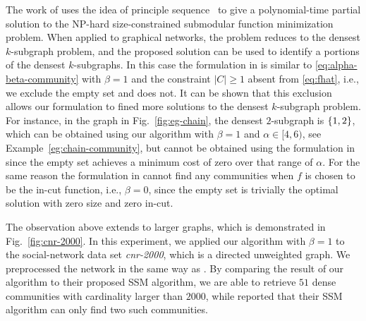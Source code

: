 The work of \cite{nagano2011size} uses the idea of principle
sequence~\cite{fujishige80,fujishige05,fujishige-pp-revisited} to give a polynomial-time partial
solution to the NP-hard size-constrained submodular function minimization problem. When applied to
graphical networks, the problem reduces to the densest $k$-subgraph problem, and the proposed
solution can be used to identify a portions of the densest $k$-subgraphs.
%
In this case the formulation  in \cite{nagano2011size} is similar to 
\eqref{eq:alpha-beta-community} 
with $\beta = 1$ and the constraint $|C| \geq 1$
absent from \eqref{eq:fhat}, i.e., we exclude the empty
set and \cite{nagano2011size} does not.
It can be shown that this exclusion allows our formulation to fined more solutions to the densest
$k$-subgraph problem. For instance, 
in the graph in Fig.~\ref{fig:eg-chain}, the densest $2$-subgraph is $\{1,2\}$, which can be
obtained using our algorithm with $\beta = 1$ and $\alpha \in [4,6)$, see
Example~\ref{eg:chain-community}, but cannot be obtained using the formulation in
\cite{nagano2011size} since the empty set achieves a minimum cost of zero over that range of
$\alpha$.
For the same reason the formulation in \cite{nagano2011size} cannot find any communities when
$f$ is chosen to be the in-cut function, i.e., $\beta = 0$, since the empty set is trivially the
optimal solution with zero size and zero in-cut.


The observation above extends to larger graphs, which is demonstrated in Fig.~\ref{fig:cnr-2000}.
In this experiment, we applied our algorithm with $\beta = 1$ to the social-network data set
\emph{cnr-2000}, which is a directed unweighted graph. We preprocessed the network in the same way
as \cite{nagano2011size}.
By comparing the result of our algorithm to their proposed SSM algorithm, we are able to retrieve
$51$ dense communities with cardinality larger than $2000$, while \cite{nagano2011size} reported that their SSM algorithm can only find
two such communities.

